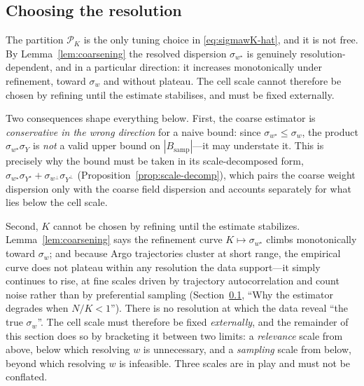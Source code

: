 \subsection{Choosing the resolution}
\label{sec:resolution}


The partition $\mathcal{P}_K$ is the only tuning choice in
\eqref{eq:sigmawK-hat}, and it is not free. By
Lemma~\ref{lem:coarsening} the resolved dispersion $\sigma_{w^{\star}}$
is genuinely resolution-dependent, and in a particular direction: it
increases monotonically under refinement, toward $\sigma_w$ and without
plateau. The cell scale cannot therefore be chosen by refining until the
estimate stabilises, and must be fixed externally.

Two consequences shape everything below. First, the coarse estimator is
\emph{conservative in the wrong direction} for a naive bound: since
$\sigma_{w^{\star}}\le\sigma_w$, the product $\sigma_{w^{\star}}\sigma_Y$
is \emph{not} a valid upper bound on $|B_{\mathrm{samp}}|$---it may
understate it. This is precisely why the bound must be taken in its
scale-decomposed form,
$\sigma_{w^{\star}}\sigma_{Y^{\star}}+\sigma_{w^{\perp}}\sigma_{Y^{\perp}}$
(Proposition~\ref{prop:scale-decomp}), which pairs the coarse weight
dispersion only with the coarse field dispersion and accounts separately
for what lies below the cell scale.

Second, $K$ cannot be chosen by refining until the estimate stabilizes.
Lemma~\ref{lem:coarsening} says the refinement curve
$K\mapsto\sigma_{w^{\star}}$ climbs monotonically toward $\sigma_w$; and
because Argo trajectories cluster at short range, the empirical curve
does not plateau within any resolution the data support---it simply
continues to rise, at fine scales driven by trajectory autocorrelation
and count noise rather than by preferential sampling
(Section~\ref{sec:resolution}, ``Why the estimator degrades when
$N/K<1$''). There is no resolution at which the data reveal ``the true
$\sigma_w$''. The cell scale must therefore be fixed \emph{externally},
and the remainder of this section does so by bracketing it between two
limits: a \emph{relevance} scale from above, below which resolving $w$ is
unnecessary, and a \emph{sampling} scale from below, beyond which
resolving $w$ is infeasible. Three scales are in play and must not be
conflated.


